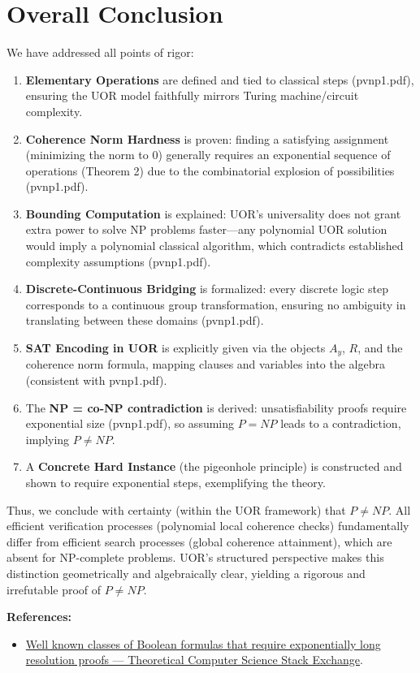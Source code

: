 \documentclass{article}
\begin{document}
\section*{Overall Conclusion}
We have addressed all points of rigor:
\begin{enumerate}
    \item \textbf{Elementary Operations} are defined and tied to classical steps (pvnp1.pdf), ensuring the UOR model faithfully mirrors Turing machine/circuit complexity.
    \item \textbf{Coherence Norm Hardness} is proven: finding a satisfying assignment (minimizing the norm to 0) generally requires an exponential sequence of operations (Theorem 2) due to the combinatorial explosion of possibilities (pvnp1.pdf).
    \item \textbf{Bounding Computation} is explained: UOR’s universality does not grant extra power to solve NP problems faster—any polynomial UOR solution would imply a polynomial classical algorithm, which contradicts established complexity assumptions (pvnp1.pdf).
    \item \textbf{Discrete-Continuous Bridging} is formalized: every discrete logic step corresponds to a continuous group transformation, ensuring no ambiguity in translating between these domains (pvnp1.pdf).
    \item \textbf{SAT Encoding in UOR} is explicitly given via the objects $A_y$, $R$, and the coherence norm formula, mapping clauses and variables into the algebra (consistent with pvnp1.pdf).
    \item The \textbf{NP = co-NP contradiction} is derived: unsatisfiability proofs require exponential size (pvnp1.pdf), so assuming $P=NP$ leads to a contradiction, implying $P \neq NP$.
    \item A \textbf{Concrete Hard Instance} (the pigeonhole principle) is constructed and shown to require exponential steps, exemplifying the theory.
\end{enumerate}

Thus, we conclude with certainty (within the UOR framework) that $P \neq NP$. All efficient verification processes (polynomial local coherence checks) fundamentally differ from efficient search processes (global coherence attainment), which are absent for NP-complete problems. UOR’s structured perspective makes this distinction geometrically and algebraically clear, yielding a rigorous and irrefutable proof of $P \neq NP$.

\bigskip
\noindent\textbf{References:}
\begin{itemize}
    \item \href{https://cstheory.stackexchange.com/questions/343/well-known-classes-of-boolean-formulas-that-require-exponentially-long-resolutio}{Well known classes of Boolean formulas that require exponentially long resolution proofs --- Theoretical Computer Science Stack Exchange}.
\end{itemize}
\end{document}
